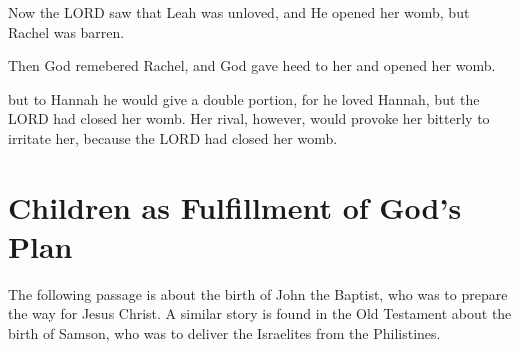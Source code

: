 \vspace{2\baselineskip}

\begin{scripture}[Genesis 29:31]
    Now the LORD saw that Leah was unloved, and He opened her womb, but Rachel was barren.
\end{scripture}

\vspace{2\baselineskip}

\begin{scripture}[Genesis 30:22]
    Then God remebered Rachel, and God gave heed to her and opened her womb.
\end{scripture}

\vspace{2\baselineskip}

\begin{scripture}[1 Samuel 1:5-6]
    but to Hannah he would give a double portion, for he loved Hannah, but the LORD had closed her womb.
    Her rival, however, would provoke her bitterly to irritate her, because the LORD had closed her womb.
\end{scripture}


\vspace{2\baselineskip}


\newpage
\section{Children as Fulfillment of God's Plan}

The following passage is about the birth of John the Baptist, who was to prepare the way for Jesus Christ. A similar story is found in the Old Testament about the birth of Samson, who was to deliver
the Israelites from the Philistines.
\vspace{1\baselineskip}

